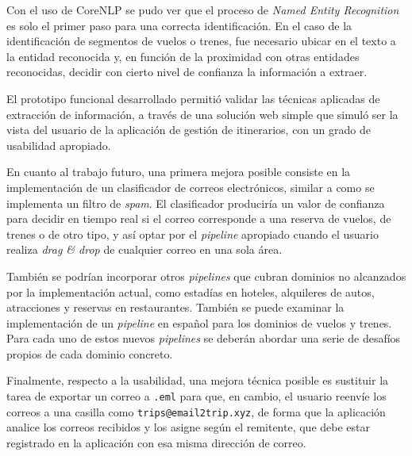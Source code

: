 Con el uso de CoreNLP se pudo ver que el proceso de \textit{Named Entity Recognition} es solo el primer paso para una correcta
identificación.
En el caso de la identificación de segmentos de vuelos o trenes, fue necesario ubicar en el texto a la entidad
reconocida y, en función de la proximidad con otras entidades reconocidas, decidir con cierto nivel de confianza la
información a extraer.

El prototipo funcional desarrollado permitió validar las técnicas aplicadas de extracción de información, a través de
una solución web simple que simuló ser la vista del usuario de la aplicación de gestión de itinerarios, con un grado de
usabilidad apropiado.

En cuanto al trabajo futuro, una primera mejora posible consiste en la implementación de un clasificador de correos
electrónicos, similar a como se implementa un filtro de \textit{spam}.
El clasificador produciría un valor de confianza para decidir en tiempo real si el correo corresponde a una reserva de
vuelos, de trenes o de otro tipo, y así optar por el \textit{pipeline} apropiado cuando el usuario realiza
\textit{drag \& drop} de cualquier correo en una sola área.

También se podrían incorporar otros \textit{pipelines} que cubran dominios no alcanzados por la implementación actual,
como estadías en hoteles, alquileres de autos, atracciones y reservas en restaurantes.
También se puede examinar la implementación de un \textit{pipeline} en español para los dominios de vuelos y trenes.
Para cada uno de estos nuevos \textit{pipelines} se deberán abordar una serie de desafíos propios de cada dominio concreto.

Finalmente, respecto a la usabilidad, una mejora técnica posible es sustituir la tarea de exportar un correo a
\texttt{.eml} para que, en cambio, el usuario reenvíe los correos a una casilla como \texttt{trips@email2trip.xyz}, de
forma que la aplicación analice los correos recibidos y los asigne según el remitente, que debe estar registrado en la
aplicación con esa misma dirección de correo.
